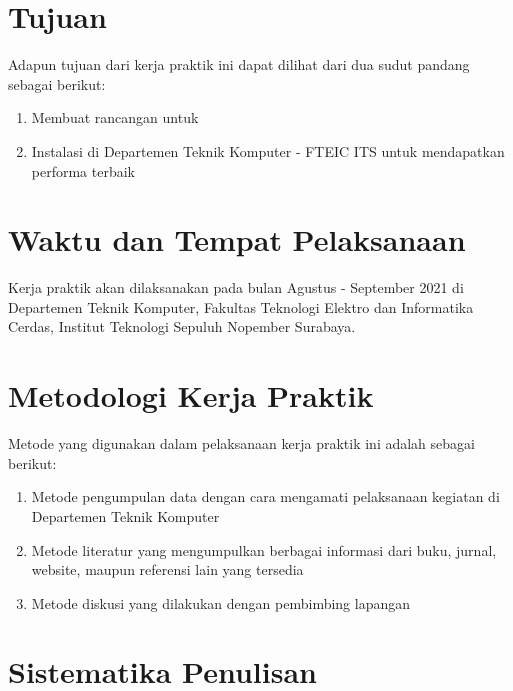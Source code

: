 \section{Tujuan}

Adapun tujuan dari kerja praktik ini dapat dilihat dari dua sudut pandang sebagai berikut:

\begin{enumerate}[nolistsep]

  \item Membuat rancangan  untuk 

  \item Instalasi  di Departemen Teknik Komputer - FTEIC ITS untuk mendapatkan performa terbaik

\end{enumerate}


\section{Waktu dan Tempat Pelaksanaan}

Kerja praktik akan dilaksanakan pada bulan Agustus - September 2021 di Departemen Teknik Komputer, Fakultas Teknologi Elektro dan Informatika Cerdas, Institut Teknologi Sepuluh Nopember Surabaya.

\section{Metodologi Kerja Praktik}

Metode yang digunakan dalam pelaksanaan kerja praktik ini adalah sebagai berikut:

\begin{enumerate}[nolistsep]

  \item Metode pengumpulan data dengan cara mengamati pelaksanaan kegiatan di Departemen Teknik Komputer

  \item Metode literatur yang mengumpulkan berbagai informasi dari buku, jurnal, website, maupun referensi lain yang tersedia

  \item Metode diskusi yang dilakukan dengan pembimbing lapangan

\end{enumerate}

\section{Sistematika Penulisan}

